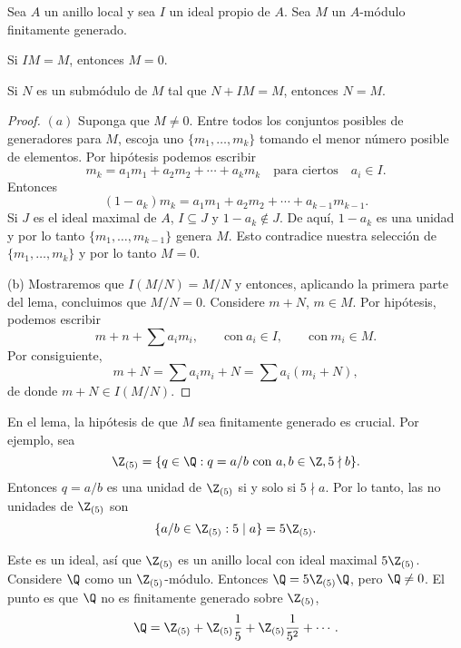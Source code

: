 \begin{lemma}[Nakayama]
  Sea $A$ un anillo local y sea $I$ un ideal propio de $A$. Sea $M$ un $A$-módulo finitamente generado.
  \begin{subtheorem}
    \item Si $IM = M$, entonces $M = 0$.
    \item Si $N$ es un submódulo de $M$ tal que $N+IM = M$, entonces $N = M$.
  \end{subtheorem}
\end{lemma}
\begin{proof}
  $(a)$ Suponga que $M \neq 0$. Entre todos los conjuntos posibles de generadores para $M$, escoja uno $\{m_1,\ldots,m_k\}$ tomando el menor número posible de elementos. Por hipótesis podemos escribir
  \[
    m_k = a_1 m_1 + a_2 m_2 + \cdots + a_k m_k
      \quad\text{para ciertos}\quad a_i \in I.
  \]
  Entonces
  \[
    (1-a_k)m_k = a_1 m_1 + a_2 m_2 + \cdots + a_{k-1} m_{k-1}.
  \]
  Si $J$ es el ideal maximal de $A$, $I \subseteq J$ y $1-a_k \notin J$. De aquí, $1-a_k$ es una unidad y por lo tanto $\{m_1,\ldots,m_{k-1}\}$ genera $M$. Esto contradice nuestra selección de $\{m_1,\ldots,m_k\}$ y por lo tanto $M = 0$.

  (b) Mostraremos que $I(M/N) = M/N$ y entonces, aplicando la primera parte del lema, concluimos que $M/N = 0$. Considere $m+N$, $m \in M$. Por hipótesis, podemos escribir
  \[
    m + n + \sum a_i m_i,
      \qquad \text{con}\ a_i \in I,
      \qquad \text{con}\ m_i \in M.
  \]
  Por consiguiente,
  \[
    m+N = \sum a_i m_i + N = \sum a_i (m_i + N),
  \]
  de donde $m + N \in I(M/N)$.
\end{proof}

En el lema, la hipótesis de que $M$ sea finitamente generado es crucial. Por ejemplo, sea
\[
  \Z_{(5)} = \{q \in \Q : q = a/b \ \text{con}\ a,b \in \Z, 5 \nmid b\}.
\]
Entonces $q = a/b$ es una unidad de $\Z_{(5)}$ si y solo si $5 \nmid a$. Por lo tanto, las no unidades de $\Z_{(5)}$ son
\[
  \{ a/b \in \Z_{(5)} : 5 \mid a \} = 5\Z_{(5)}.
\]

Este es un ideal, así que $\Z_{(5)}$ es un anillo local con ideal maximal $5\Z_{(5)}$. Considere $\Q$ como un $\Z_{(5)}$-módulo. Entonces $\Q = 5\Z_{(5)}\Q$, pero $\Q \neq 0$. El punto es que $\Q$ no es finitamente generado sobre $\Z_{(5)}$,
\[
  \Q = \Z_{(5)} + \Z_{(5)} \frac{1}{5} + \Z_{(5)}\frac{1}{5^2} + \cdots .
\]